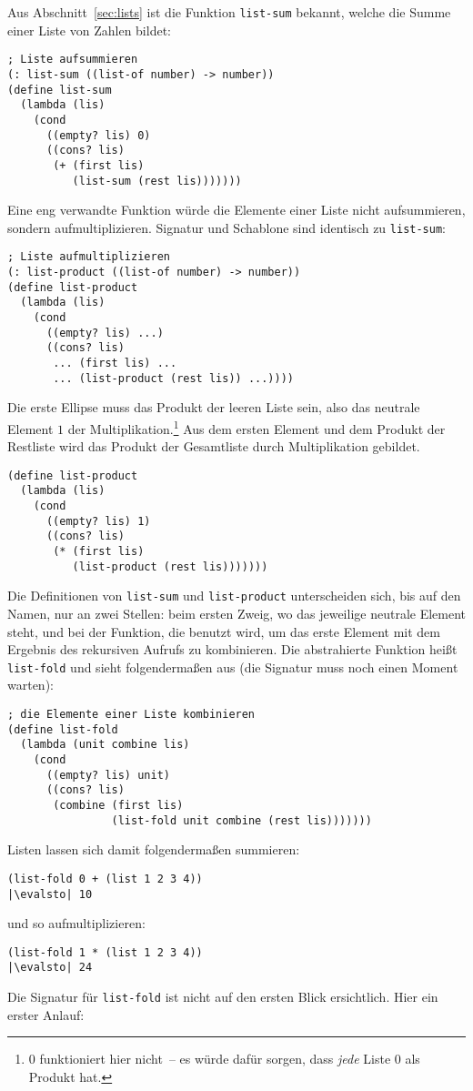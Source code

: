 Aus Abschnitt~\ref{sec:lists} ist die Funktion \texttt{list-sum}
bekannt, welche die Summe einer Liste von Zahlen bildet:
%
\begin{lstlisting}
; Liste aufsummieren
(: list-sum ((list-of number) -> number))
(define list-sum
  (lambda (lis)
    (cond
      ((empty? lis) 0)
      ((cons? lis) 
       (+ (first lis)
          (list-sum (rest lis)))))))
\end{lstlisting}
%
Eine eng verwandte Funktion würde die Elemente einer Liste nicht
aufsummieren, sondern aufmultiplizieren.   Signatur und Schablone sind
identisch zu \texttt{list-sum}:
%
\begin{lstlisting}
; Liste aufmultiplizieren
(: list-product ((list-of number) -> number))
(define list-product
  (lambda (lis)
    (cond
      ((empty? lis) ...)
      ((cons? lis) 
       ... (first lis) ...
       ... (list-product (rest lis)) ...))))
\end{lstlisting}
%
Die erste Ellipse muss das Produkt der leeren Liste sein, also das
neutrale Element $1$ der Multiplikation.\footnote{0 funktioniert
  hier nicht~-- es würde dafür sorgen,
  dass \emph{jede} Liste 0 als Produkt hat.} 
Aus dem ersten Element und dem Produkt der
Restliste wird das Produkt der Gesamtliste durch
Multiplikation gebildet.
%
\begin{lstlisting}
(define list-product
  (lambda (lis)
    (cond
      ((empty? lis) 1)
      ((cons? lis) 
       (* (first lis)
          (list-product (rest lis)))))))
\end{lstlisting}
%
Die Definitionen von \texttt{list-sum} und \texttt{list-product}
unterscheiden sich, bis auf den Namen, nur an zwei Stellen: beim ersten
Zweig, wo das jeweilige neutrale Element steht, und bei der Funktion,
die benutzt wird, um das erste Element mit dem Ergebnis des rekursiven
Aufrufs zu kombinieren.  Die abstrahierte Funktion heißt
\texttt{list-fold} und sieht folgendermaßen aus (die Signatur muss noch
einen Moment warten):
%
\begin{lstlisting}
; die Elemente einer Liste kombinieren
(define list-fold
  (lambda (unit combine lis)
    (cond
      ((empty? lis) unit)
      ((cons? lis) 
       (combine (first lis)
                (list-fold unit combine (rest lis)))))))
\end{lstlisting}
%
Listen lassen sich damit folgendermaßen summieren:
%
\begin{lstlisting}
(list-fold 0 + (list 1 2 3 4))
|\evalsto| 10
\end{lstlisting}
%
und so aufmultiplizieren:
%
\begin{lstlisting}
(list-fold 1 * (list 1 2 3 4))
|\evalsto| 24
\end{lstlisting}
%
Die Signatur für \texttt{list-fold} ist nicht auf den ersten Blick
ersichtlich.  Hier ein erster Anlauf:

